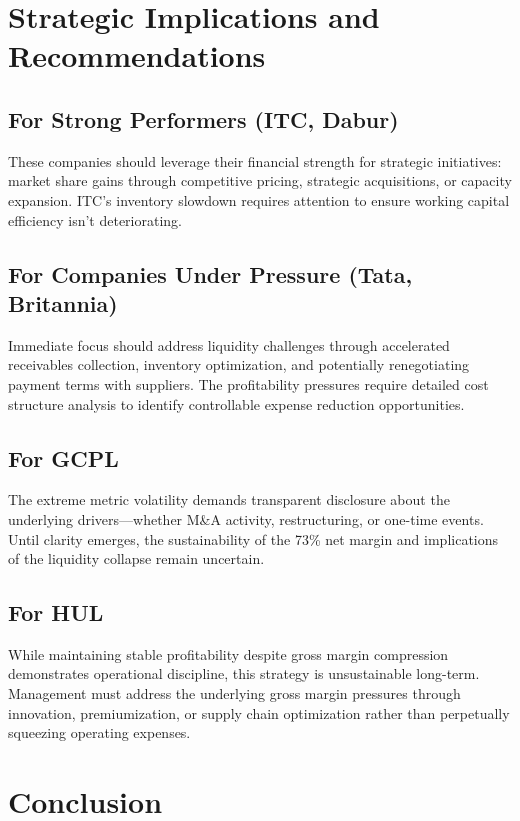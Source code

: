 \documentclass[12pt, a4paper]{report}
\begin{document}
\section{Strategic Implications and Recommendations}

\subsection{For Strong Performers (ITC, Dabur)}

These companies should leverage their financial strength for strategic initiatives: market share gains through competitive pricing, strategic acquisitions, or capacity expansion. ITC's inventory slowdown requires attention to ensure working capital efficiency isn't deteriorating.

\subsection{For Companies Under Pressure (Tata, Britannia)}

Immediate focus should address liquidity challenges through accelerated receivables collection, inventory optimization, and potentially renegotiating payment terms with suppliers. The profitability pressures require detailed cost structure analysis to identify controllable expense reduction opportunities.

\subsection{For GCPL}

The extreme metric volatility demands transparent disclosure about the underlying drivers—whether M\&A activity, restructuring, or one-time events. Until clarity emerges, the sustainability of the 73\% net margin and implications of the liquidity collapse remain uncertain.

\subsection{For HUL}

While maintaining stable profitability despite gross margin compression demonstrates operational discipline, this strategy is unsustainable long-term. Management must address the underlying gross margin pressures through innovation, premiumization, or supply chain optimization rather than perpetually squeezing operating expenses.

\section{Conclusion}
\end{document}
